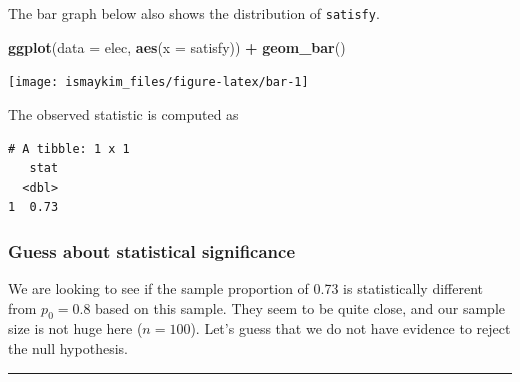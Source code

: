 \documentclass[12pt,]{krantz}
\makeatletter
\newenvironment{Shaded}{\begin{snugshade}}{\end{snugshade}}
\newcommand{\KeywordTok}[1]{\textcolor[rgb]{0.27,0.27,0.27}{\textbf{#1}}}
\newcommand{\DataTypeTok}[1]{\textcolor[rgb]{0.27,0.27,0.27}{#1}}
\newcommand{\StringTok}[1]{\textcolor[rgb]{0.5,0.5,0.5}{#1}}
\newcommand{\OperatorTok}[1]{\textcolor[rgb]{0.43,0.43,0.43}{\textbf{#1}}}
\newcommand{\NormalTok}[1]{#1}
\newenvironment{kframe}{%
\medskip{}
\setlength{\fboxsep}{.8em}
 \def\at@end@of@kframe{}%
 \ifinner\ifhmode%
  \def\at@end@of@kframe{\end{minipage}}%
  \begin{minipage}{\columnwidth}%
 \fi\fi%
 \def\FrameCommand##1{\hskip\@totalleftmargin \hskip-\fboxsep
 \colorbox{shadecolor}{##1}\hskip-\fboxsep
     \hskip-\linewidth \hskip-\@totalleftmargin \hskip\columnwidth}%
 \MakeFramed {\advance\hsize-\width
   \@totalleftmargin\z@ \linewidth\hsize
   \@setminipage}}%
 {\par\unskip\endMakeFramed%
 \at@end@of@kframe}
\renewenvironment{Shaded}{\begin{kframe}}{\end{kframe}}
\makeatother
\begin{document}
The bar graph below also shows the distribution of \texttt{satisfy}.

\begin{Shaded}
\begin{Highlighting}[]
\KeywordTok{ggplot}\NormalTok{(}\DataTypeTok{data =}\NormalTok{ elec, }\KeywordTok{aes}\NormalTok{(}\DataTypeTok{x =}\NormalTok{ satisfy)) }\OperatorTok{+}\StringTok{ }
\StringTok{  }\KeywordTok{geom_bar}\NormalTok{()}
\end{Highlighting}
\end{Shaded}

\begin{center}\texttt{[image: ismaykim\_files/figure-latex/bar-1]} \end{center}

The observed statistic is computed as

\begin{Shaded}
\end{Shaded}

\begin{verbatim}
# A tibble: 1 x 1
   stat
  <dbl>
1  0.73
\end{verbatim}

\subsubsection*{Guess about statistical
significance}\label{guess-about-statistical-significance-1}

We are looking to see if the sample proportion of 0.73 is statistically
different from \(p_0 = 0.8\) based on this sample. They seem to be quite
close, and our sample size is not huge here (\(n = 100\)). Let's guess
that we do not have evidence to reject the null hypothesis.

\begin{center}\rule{0.5\linewidth}{\linethickness}\end{center}
\end{document}
